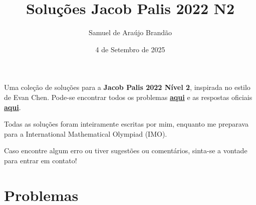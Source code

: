 \documentclass[12pt]{article}
\title{\sffamily\bfseries{Soluções Jacob Palis 2022 N2}}
\author{Samuel de Araújo Brandão}
\date{4 de Setembro de 2025}
\begin{document}
  \maketitle
  Uma coleção de soluções para a \textbf{Jacob Palis 2022 Nível 2}, inspirada no estilo de Evan Chen.
  Pode-se encontrar todos os problemas \textbf{\href{https://www.obm.org.br/content/uploads/2022/10/Prova_JacobPalis_2022.pdf}
  {aqui}} e as respostas oficiais \textbf{\href{https://www.obm.org.br/content/uploads/2022/10/gabarito_jacob_palis_2022.pdf}{aqui}}.

  Todas as soluções foram inteiramente escritas por mim, enquanto me preparava para a
  International Mathematical Olympiad (IMO).

  Caso encontre algum erro ou tiver sugestões ou comentários, sinta-se a vontade 
  para entrar em contato!

  \tableofcontents

  \clearpage

  \section{\textsf{Problemas}}
\end{document}
